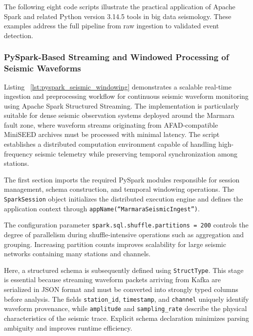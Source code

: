 \documentclass[data,article,accept,pdftex,moreauthors]{Definitions/mdpi}
\begin{document}
The following eight code scripts illustrate the practical application of Apache Spark and related Python version 3.14.5 %
 tools in big data seismology. These examples address the full pipeline from raw ingestion to validated event detection.

\subsubsection{PySpark-Based Streaming and Windowed Processing of Seismic Waveforms}

Listing %
~\ref{lst:pyspark_seismic_windowing} demonstrates a scalable real-time ingestion and preprocessing workflow for continuous seismic waveform monitoring using Apache Spark Structured Streaming. The implementation is particularly suitable for dense seismic observation systems deployed around the Marmara fault zone, where waveform streams originating from AFAD-compatible MiniSEED archives must be processed with minimal latency. The script establishes a distributed computation environment capable of handling high-frequency seismic telemetry while preserving temporal synchronization among stations.

The first section imports the required PySpark modules responsible for session management, schema construction, and temporal windowing operations. The \texttt{SparkSession} object initializes the distributed execution engine and defines the application context through
\texttt{appName(``MarmaraSeismicIngest'')}. 

The configuration parameter
\texttt{spark.sql.shuffle.partitions = 200}
controls the degree of parallelism during shuffle-intensive operations such as aggregation and grouping. Increasing partition counts improves scalability for large seismic networks containing many stations and channels.

Here, a structured schema is subsequently defined using \texttt{StructType}. This stage is essential because streaming waveform packets arriving from Kafka are serialized in JSON format and must be converted into strongly typed columns before analysis. The fields \texttt{station\_id}, \texttt{timestamp}, and \texttt{channel} uniquely identify waveform provenance, while \texttt{amplitude} and \texttt{sampling\_rate} describe the physical characteristics of the seismic trace. Explicit schema declaration minimizes parsing ambiguity and improves runtime efficiency.
\end{document}

